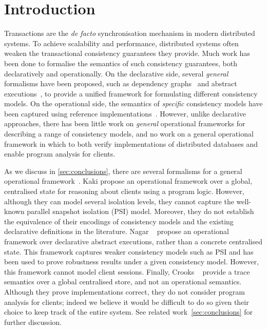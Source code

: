 \section{Introduction}
Transactions are the \emph{de facto} synchronisation mechanism in modern distributed systems.
To achieve scalability and performance, distributed systems often weaken the transactional consistency guarantees they provide. 
%
%
Much work has been done to formalise the semantics of such consistency guarantees, both
declaratively and operationally.
On the declarative side, several \emph{general} formalisms have been proposed, 
such as dependency graphs~\cite{.} and abstract executions~\cite{.}, to provide a unified
framework for formulating different consistency models.  
On the operational side, the semantics of \emph{specific} consistency models have
been captured using reference implementations~\cite{si,PSI,PSI-RA}. 
However, unlike declarative approaches, there has been
little work on \emph{general} operational frameworks for describing a range
of consistency models, and no work on a general operational framework
in which to both verify implementations of distributed databases and 
enable program analysis for clients.

As we discuss in \cref{sec:conclusions}, there are several formalisms for a general operational framework~\cite{sureshConcur,.,.}. 
Kaki \etal propose an operational framework over a global, centralised state for reasoning about clients using a program logic. 
However, although they can model several isolation levels, they cannot capture the well-known
parallel snapshot isolation (PSI) model. 
Moreover, they do not establish the equivalence of their encodings of consistency models 
and the existing declarative definitions in the literature. 
Nagar \etal~\cite{.} propose an operational framework over declarative abstract executions, rather than a concrete centralised state. This framework captures weaker consistency models
such as PSI and has been used to prove robustness results under a given consistency model.  
However, this framework cannot model client sessions.
Finally, Crooks \etal~\cite{.} provide a trace semantics over a global
centralised store, and not an operational semantics. 
Although they prove implementations correct, they do not consider program analysis for clients;
indeed we believe it would be difficult to do so given their choice to
keep track of the entire system.
See related work~\cref{sec:conclusions} for further discussion. 




